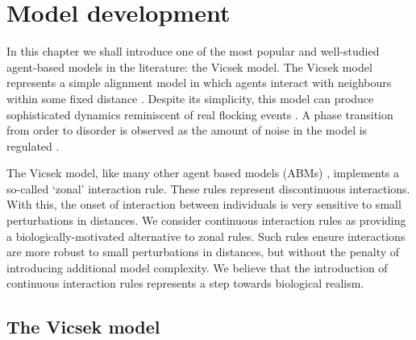 \graphicspath{{fig/model_development/}}

\chapter{Model development}
\label{cha:model_dev}

In this chapter we shall introduce one of the most popular and well-studied
agent-based models in the literature: the Vicsek model. The Vicsek model
represents a simple alignment model in which agents interact with neighbours
within some fixed distance \parencite{vicsek95}. Despite its simplicity, this
model can produce sophisticated dynamics reminiscent of real flocking events
\parencite{ginelli16}. A phase transition from order to disorder is observed as
the amount of noise in the model is regulated \parencite{vicsek12}.

The Vicsek model, like many other agent based models (ABMs)
\parencite{aoki82,couzin02,huth92}, implements a so-called `zonal' interaction
rule. These rules represent discontinuous interactions. With this, the onset of
interaction between individuals is very sensitive to small perturbations in
distances. We consider continuous interaction rules as providing a
biologically-motivated alternative to zonal rules. Such rules ensure
interactions are more robust to small perturbations in distances, but without
the penalty of introducing additional model complexity. We believe that the
introduction of continuous interaction rules represents a step towards
biological realism. 

\section{The Vicsek model}
\label{sec:vicsek_model}

